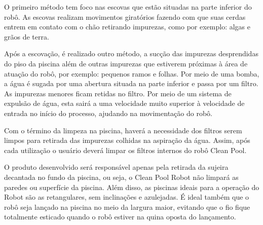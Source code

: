 O primeiro método tem foco nas escovas que estão situadas na parte inferior do robô. As escovas realizam movimentos giratórios fazendo com que suas cerdas entrem em contato com o chão retirando  impurezas, como por exemplo: algas e grãos de terra.

Após a escovação, é realizado outro método, a sucção das impurezas desprendidas do piso da piscina  além de outras impurezas que estiverem próximas à área de atuação do robô, por exemplo: pequenos ramos e folhas. Por meio de uma bomba, a água é sugada por uma abertura situada na parte inferior e passa por um filtro. As impurezas menores ficam retidas no filtro. Por meio de um sistema de expulsão de água, esta sairá a uma velocidade muito superior à velocidade de entrada no início do processo, ajudando na movimentação do robô.

Com o término da limpeza na piscina, haverá a necessidade dos filtros serem limpos para retirada das impurezas colhidas na aspiração da água. Assim, após cada utilização o usuário deverá limpar os filtros internos do robô Clean Pool.

O produto desenvolvido será responsável apenas pela retirada da sujeira decantada no fundo da piscina, ou seja, o Clean Pool Robot não limpará as paredes ou superfície da piscina. Além disso, as piscinas ideais para a operação do Robot são as retangulares, sem inclinações e azulejadas. É ideal também que o robô seja lançado na piscina no meio da largura maior, evitando que o fio fique totalmente esticado quando o robô estiver na quina oposta do lançamento.  

